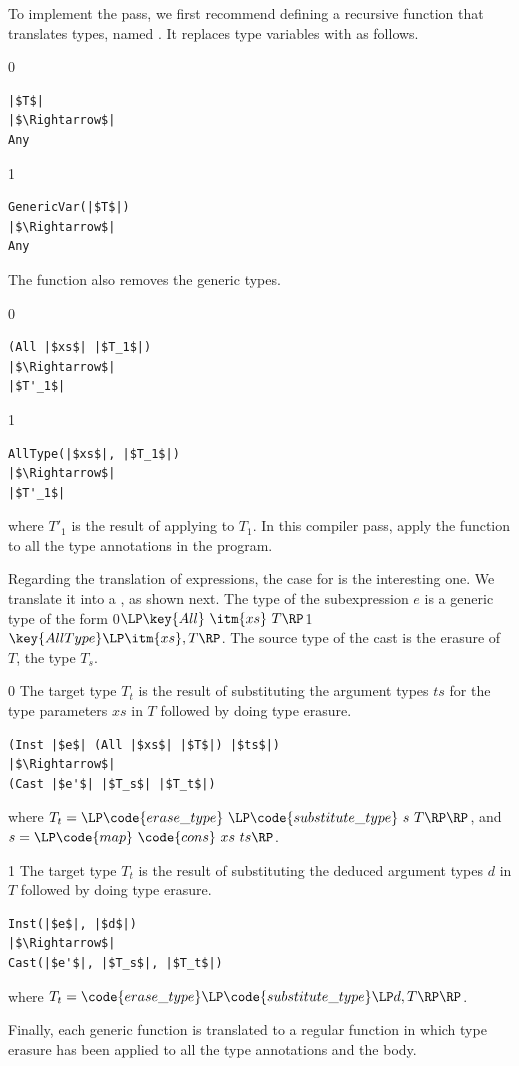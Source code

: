 \documentclass[7x10]{TimesAPriori_MIT}%
\def\racketEd{0}
\def\pythonEd{1}
\def\edition{1}
\newcommand{\racket}[1]{{\if\edition\racketEd{#1}\fi}}
\newcommand{\pythonColor}[0]{}
\newcommand{\python}[1]{{\if\edition\pythonEd\pythonColor #1\fi}}
\numberwithin{theorem}{chapter}
\numberwithin{definition}{chapter}
\numberwithin{equation}{chapter}
\begin{document}
To implement the  pass, we first recommend defining
a recursive function that translates types, named
. It replaces type variables with \CANYTY{} as
follows.
%
{\if\edition\racketEd
\begin{lstlisting}
|$T$|
|$\Rightarrow$|
Any
\end{lstlisting}
\fi}
{\if\edition\pythonEd\pythonColor
\begin{lstlisting}
GenericVar(|$T$|)
|$\Rightarrow$|
Any
\end{lstlisting}
\fi}
%
\noindent The  function also removes the generic
 types.
%
{\if\edition\racketEd
\begin{lstlisting}
(All |$xs$| |$T_1$|)
|$\Rightarrow$|
|$T'_1$|
\end{lstlisting}
\fi}
{\if\edition\pythonEd\pythonColor
\begin{lstlisting}
AllType(|$xs$|, |$T_1$|)
|$\Rightarrow$|
|$T'_1$|
\end{lstlisting}
\fi}
where $T'_1$ is the result of applying  to $T_1$.
%
In this compiler pass, apply the  function to all 
the type annotations in the program.

Regarding the translation of expressions, the case for  is
the interesting one. We translate it into a , as shown
next.
The type of the subexpression $e$ is a generic type of the form
\racket{$\LP\key{All}~\itm{xs}~T\RP$}\python{$\key{AllType}\LP\itm{xs}, T\RP$}.
The source type of the cast is the erasure of $T$, the type $T_s$.
%
{\if\edition\racketEd
%
The target type $T_t$ is the result of substituting the argument types
$ts$ for the type parameters $xs$ in $T$ followed by doing type
erasure.
%
\begin{lstlisting}
(Inst |$e$| (All |$xs$| |$T$|) |$ts$|)
|$\Rightarrow$|
(Cast |$e'$| |$T_s$| |$T_t$|)
\end{lstlisting}
%
where $T_t = \LP\code{erase\_type}~\LP\code{substitute\_type}~s~T\RP\RP$,
and $s = \LP\code{map}~\code{cons}~xs~ts\RP$.
\fi}
{\if\edition\pythonEd\pythonColor
%
The target type $T_t$ is the result of substituting the deduced
argument types $d$ in $T$ followed by doing type erasure.
%
\begin{lstlisting}
Inst(|$e$|, |$d$|)
|$\Rightarrow$|
Cast(|$e'$|, |$T_s$|, |$T_t$|)
\end{lstlisting}
%
where
$T_t = \code{erase\_type}\LP\code{substitute\_type}\LP d, T\RP\RP$.
\fi}

Finally, each generic function is translated to a regular
function in which type erasure has been applied to all the type
annotations and the body.
\end{document}
